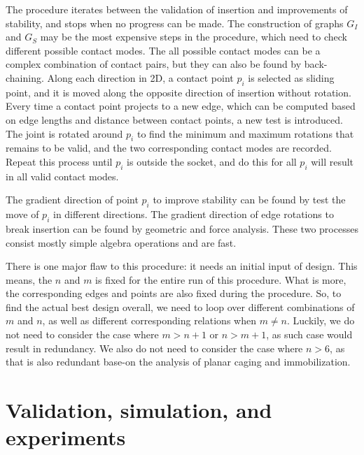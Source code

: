 \documentclass[letterpaper, 10 pt, conference]{ieeeconf}
\begin{document}
The procedure iterates between the validation of insertion and improvements of stability, and stops when no progress can be made. The construction of graphs $G_I$ and $G_S$ may be the most expensive steps in the procedure, which need to check different possible contact modes. The all possible contact modes can be a complex combination of contact pairs, but they can also be found by back-chaining. Along each direction in 2D, a contact point $p_i$ is selected as sliding point, and it is moved along the opposite direction of insertion without rotation. Every time a contact point projects to a new edge, which can be computed based on edge lengths and distance between contact points, a new test is introduced. The joint is rotated around $p_i$ to find the minimum and maximum rotations that remains to be valid, and the two corresponding contact modes are recorded. Repeat this process until $p_i$ is outside the socket, and do this for all $p_i$ will result in all valid contact modes. 

The gradient direction of point $p_i$ to improve stability can be found by test the move of $p_i$ in different directions. The gradient direction of edge rotations to break insertion can be found by geometric and force analysis. These two processes consist mostly simple algebra operations and are fast. 

There is one major flaw to this procedure: it needs an initial input of design. This means, the $n$ and $m$ is fixed for the entire run of this procedure. What is more, the corresponding edges and points are also fixed during the procedure. So, to find the actual best design overall, we need to loop over different combinations of $m$ and $n$, as well as different corresponding relations when $m \neq n$. Luckily, we do not need to consider the case where $m > n+1$ or $n > m+1$, as such case would result in redundancy. We also do not need to consider the case where $n > 6$, as that is also redundant base-on the analysis of planar caging and immobilization. 


\section{Validation, simulation, and experiments}



\end{document}
